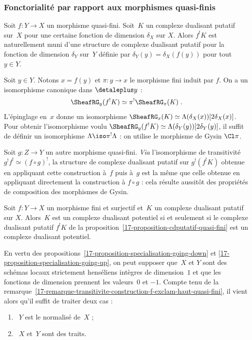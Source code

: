 \documentclass[10pt]{../fichiers-configuration-latex/smfart}
\begin{document}
\subsubsection{Fonctorialité par rapport aux morphismes quasi-finis}%

\begin{proposition3}\label{17-proposition-cdputatif-quasi-fini}
Soit $f\colon Y\to X$ un morphisme quasi-fini. Soit $K$ un complexe dualisant
putatif sur $X$ pour une certaine fonction de dimension $\delta_X$ sur $X$.
Alors $f^!K$ est naturellement muni d'une structure de complexe dualisant
putatif pour la fonction de dimension $\delta_Y$ sur $Y$ définie par
$\delta_Y(y)=\delta_X(f(y))$ pour tout $y\in Y$.
\end{proposition3}

Soit $y\in Y$. Notons $x=f(y)$ et $\pi\colon y\to x$ le morphisme fini
induit par $f$. On a un isomorphisme canonique dans $\detaleplus y$ :
\[\SheafRG_y(f^!K)\simeq \pi^! \SheafRG_x(K)\;\text{.}\]
L'épinglage en $x$ donne un isomorphisme $\SheafRG_x(K)\simeq
\Lambda(\delta_X(x))[2\delta_X(x)]$. Pour obtenir l'isomorphisme voulu
$\SheafRG_y(f^!K)\simeq \Lambda(\delta_Y(y))[2\delta_Y(y)]$, il
suffit de définir un isomorphisme $\Lambda\iso \pi^!\Lambda$ : on
utilise le morphisme de Gysin $\Cl \pi$.

\begin{remarque3}\label{17-remarque-transitivite-construction-f-exclam-haut-quasi-fini}
Soit $g\colon Z\to Y$ un autre morphisme quasi-fini. \emph{Via}
l'isomorphisme de transitivité $g^!f^!\simeq (f\circ g)^!$, la structure de
complexe dualisant putatif sur $g^!(f^!K)$ obtenue en appliquant cette
construction à $f$ puis à $g$ est la même que celle obtenue en appliquant
directement la construction à $f\circ g$ : cela résulte aussitôt des
propriétés de composition des morphismes de Gysin.
\end{remarque3}

\begin{proposition3}\label{17-proposition-cdpotentiel-morphisme-fini}
Soit $f\colon Y\to X$ un morphisme fini et surjectif et $K$ un complexe
dualisant putatif sur $X$. Alors $K$ est un complexe dualisant potentiel si
et seulement si le complexe dualisant putatif $f^!K$ de la 
proposition~\ref{17-proposition-cdputatif-quasi-fini} est
un complexe dualisant potentiel.
\end{proposition3}

En vertu des propositions~\ref{17-proposition-specialisation-going-down} et
\ref{17-proposition-specialisation-going-up}, on peut supposer que $X$ et $Y$
sont des schémas locaux strictement henséliens intègres de dimension $1$
et que les fonctions de dimension prennent les valeurs $0$ et $-1$.
Compte tenu de la
remarque~\ref{17-remarque-transitivite-construction-f-exclam-haut-quasi-fini}, il
vient alors qu'il suffit de traiter deux cas :
\begin{enumerate}
\item[(1)] $Y$ est le normalisé de $X$ ;
\item[(2)] $X$ et $Y$ sont des traits.
\end{enumerate}
\end{document}
